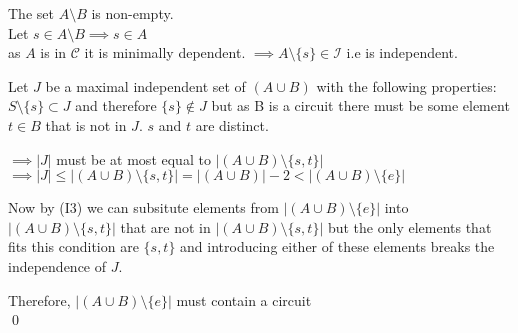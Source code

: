 \documentclass{article}
\theoremstyle{plain}
\theoremstyle{definition}
\theoremstyle{remark}
\begin{document}
 \vspace{2mm}
 
\noindent The set $ A \setminus B $ is non-empty.\\
 Let $ s \in A \setminus B    \implies s \in A$\\
 \noindent as $A$ is in $\mathcal{C}$ it is minimally dependent.
 \noindent $\implies A \setminus \{s\} \in \mathcal{I}$ i.e is independent.
 
 \vspace{2mm}
 
\noindent Let $J$ be a maximal independent set of $(A \cup B)$ with the following properties: $S \setminus \{s\} \subset J $ and therefore $ \{s\} \notin J $ but as B is a circuit there must be some element $t \in B$ that is not in $J$. $s$ and $t$ are distinct.
 
 \vspace{2mm}
 
\noindent $\implies |J| $ must be at most equal to $|(A \cup B) \setminus \{s,t\}| $\\
 $\implies |J| \leq |(A \cup B) \setminus \{s,t\}| = |(A \cup B)| - 2 < |(A \cup B) \setminus \{e\}|$
 
 \vspace{2mm} 
 
 \noindent Now by (I3) we can subsitute elements from $|(A \cup B) \setminus \{e\}|$ into $|(A \cup B) \setminus \{s,t\}|$ that are not in $|(A \cup B) \setminus \{s,t\}|$ but the only elements that fits this condition are $\{s,t\}$ and introducing either of these elements breaks the independence of $J$.
 
\noindent Therefore, $|(A \cup B) \setminus \{e\}|$ must contain a circuit\\
 \qed
 
\end{document}

